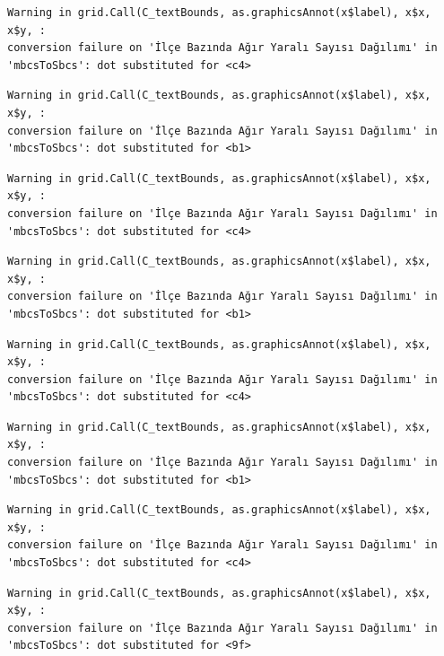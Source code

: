 \documentclass[
  11pt,
  a4paper,
  DIV=11,
  numbers=noendperiod]{scrartcl}
\begin{document}
\begin{verbatim}
Warning in grid.Call(C_textBounds, as.graphicsAnnot(x$label), x$x, x$y, :
conversion failure on 'İlçe Bazında Ağır Yaralı Sayısı Dağılımı' in
'mbcsToSbcs': dot substituted for <c4>
\end{verbatim}

\begin{verbatim}
Warning in grid.Call(C_textBounds, as.graphicsAnnot(x$label), x$x, x$y, :
conversion failure on 'İlçe Bazında Ağır Yaralı Sayısı Dağılımı' in
'mbcsToSbcs': dot substituted for <b1>
\end{verbatim}

\begin{verbatim}
Warning in grid.Call(C_textBounds, as.graphicsAnnot(x$label), x$x, x$y, :
conversion failure on 'İlçe Bazında Ağır Yaralı Sayısı Dağılımı' in
'mbcsToSbcs': dot substituted for <c4>
\end{verbatim}

\begin{verbatim}
Warning in grid.Call(C_textBounds, as.graphicsAnnot(x$label), x$x, x$y, :
conversion failure on 'İlçe Bazında Ağır Yaralı Sayısı Dağılımı' in
'mbcsToSbcs': dot substituted for <b1>
\end{verbatim}

\begin{verbatim}
Warning in grid.Call(C_textBounds, as.graphicsAnnot(x$label), x$x, x$y, :
conversion failure on 'İlçe Bazında Ağır Yaralı Sayısı Dağılımı' in
'mbcsToSbcs': dot substituted for <c4>
\end{verbatim}

\begin{verbatim}
Warning in grid.Call(C_textBounds, as.graphicsAnnot(x$label), x$x, x$y, :
conversion failure on 'İlçe Bazında Ağır Yaralı Sayısı Dağılımı' in
'mbcsToSbcs': dot substituted for <b1>
\end{verbatim}

\begin{verbatim}
Warning in grid.Call(C_textBounds, as.graphicsAnnot(x$label), x$x, x$y, :
conversion failure on 'İlçe Bazında Ağır Yaralı Sayısı Dağılımı' in
'mbcsToSbcs': dot substituted for <c4>
\end{verbatim}

\begin{verbatim}
Warning in grid.Call(C_textBounds, as.graphicsAnnot(x$label), x$x, x$y, :
conversion failure on 'İlçe Bazında Ağır Yaralı Sayısı Dağılımı' in
'mbcsToSbcs': dot substituted for <9f>
\end{verbatim}
\end{document}
